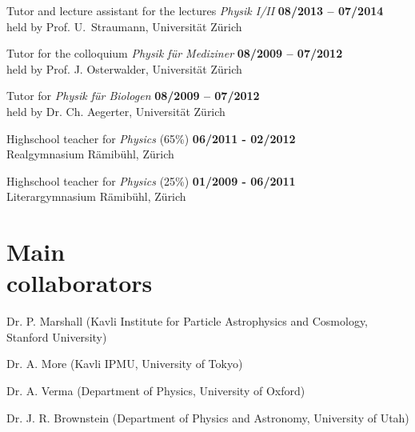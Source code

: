 \documentclass[margin,line]{resume}
\begin{document}
\begin{resume}
\begin{list2}
  \item Tutor and lecture assistant for the lectures \emph{Physik I/II}
    \hfill {\bf 08/2013 -- 07/2014} \\
    {\small
      held by Prof. U.~Straumann, 
      Universität Zürich
    }

  \item Tutor for the colloquium \emph{Physik für Mediziner}
    \hfill {\bf 08/2009 -- 07/2012} \\
    {\small
      held by Prof. J. Osterwalder, 
      Universität Zürich
    }

  \item Tutor for \emph{Physik für Biologen}
    \hfill {\bf 08/2009 -- 07/2012} \\
    {\small
      held by Dr. Ch. Aegerter,
      Universität Zürich
    }

  \item Highschool teacher for \emph{Physics} (65\%)
    \hfill {\bf 06/2011 - 02/2012}\\
    {\small
      Realgymnasium Rämibühl, Zürich
    }

  \item Highschool teacher for \emph{Physics} (25\%)
    \hfill {\bf 01/2009 - 06/2011}\\
    {\small
      Literargymnasium Rämibühl, Zürich
    }

\end{list2}



\section{\mysidestyle Main\\collaborators}

\begin{list2}
  \item Dr. P. Marshall (Kavli Institute for Particle Astrophysics and Cosmology, Stanford University)
  \item Dr. A. More (Kavli IPMU, University of Tokyo)
  \item Dr. A. Verma (Department of Physics, University of Oxford)
  \item Dr. J. R. Brownstein (Department of Physics and Astronomy, University of Utah)
\end{list2}




\end{resume}
\end{document}
